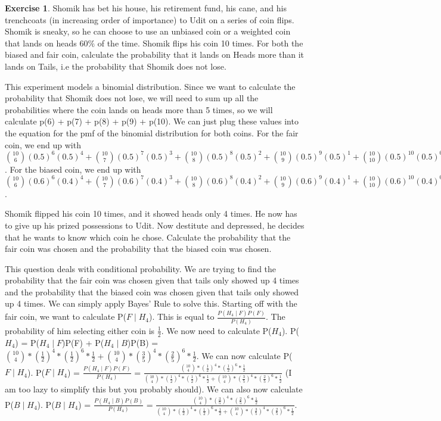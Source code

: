 \documentclass[12pt]{amsart}
\theoremstyle{definition}
\newtheorem{exercise}{Exercise}
\numberwithin{equation}{section}
\theoremstyle{plain}
\begin{document}
\begin{exercise}

    Shomik has bet his house, his retirement fund, his cane, and his trenchcoats (in increasing order of importance) to Udit on a series of coin flips. Shomik is sneaky, so he can choose to use an unbiased coin or a weighted coin that lands on heads 60$\%$ of the time. Shomik flips his coin 10 times. For both the biased and fair coin, calculate the probability that it lands on Heads more than it lands on Tails, i.e the probability that Shomik does not lose. 
    \begin{answer}
    This experiment models a binomial distribution. Since we want to calculate the probability that Shomik does not lose, we will need to sum up all the probabilities where the coin lands on heads more than 5 times, so we will calculate p(6) + p(7) + p(8) + p(9) + p(10). We can just plug these values into the equation for the pmf of the binomial distribution for both coins. For the fair coin, we end up with $\binom{10}{6}(0.5)^6(0.5)^4 + \binom{10}{7}(0.5)^7(0.5)^3 + \binom{10}{8}(0.5)^8(0.5)^2 + \binom{10}{9}(0.5)^9(0.5)^1 + \binom{10}{10}(0.5)^10(0.5)^0$. 
    \newline
    For the biased coin, we end up with $\binom{10}{6}(0.6)^6(0.4)^4 + \binom{10}{7}(0.6)^7(0.4)^3 + \binom{10}{8}(0.6)^8(0.4)^2 + \binom{10}{9}(0.6)^9(0.4)^1 + \binom{10}{10}(0.6)^10(0.4)^0$.
    \end{answer}
    \newline
    Shomik flipped his coin 10 times, and it showed heads only 4 times. He now has to give up his prized possessions to Udit. Now destitute and depressed, he decides that he wants to know which coin he chose. Calculate the probability that the fair coin was chosen and the probability that the biased coin was chosen.
    \begin{answer}
    This question deals with conditional probability. We are trying to find the probability that the fair coin was chosen given that tails only showed up 4 times and the probability that the biased coin was chosen given that tails only showed up 4 times. We can simply apply Bayes' Rule to solve this. Starting off with the fair coin, we want to calculate P($F\mid H_4$). This is equal to $\frac{P(H_4 \mid F)P(F)}{P(H_4)}$. The probability of him selecting either coin is $\frac{1}{2}$. We now need to calculate P($H_4$). P($H_4$) = P($H_4\mid F$)P(F) + P($H_4\mid B$)P(B) = $\binom{10}{4}* (\frac{1}{2})^4 *(\frac{1}{2})^6 * \frac{1}{2} + \binom{10}{4} * (\frac{3}{5})^4 * (\frac{2}{5})^6 * \frac{1}{2}$. We can now calculate P($F\mid H_4$). P($F\mid H_4$) = $\frac{P(H_4\mid F)P(F)}{P(H_4)}$ = $\frac{\binom{10}{4}* (\frac{1}{2})^4 *(\frac{1}{2})^6 * \frac{1}{2}}{\binom{10}{4}* (\frac{1}{2})^4 *(\frac{1}{2})^6 * \frac{1}{2} + \binom{10}{4} * (\frac{3}{5})^4 * (\frac{2}{5})^6 * \frac{1}{2}}$ (I am too lazy to simplify this but you probably should). We can also now calculate P($B\mid H_4$). P($B\mid H_4$) = $\frac{P(H_4 \mid B)P(B)}{P(H_4)}$ = $\frac{\binom{10}{4} * (\frac{3}{5})^4 * (\frac{2}{5})^6 * \frac{1}{2}}{\binom{10}{4}* (\frac{1}{2})^4 *(\frac{1}{2})^6 * \frac{1}{2} + \binom{10}{4} * (\frac{3}{5})^4 * (\frac{2}{5})^6 * \frac{1}{2}}$.
    \end{answer}
    

\end{exercise}
\end{document}
